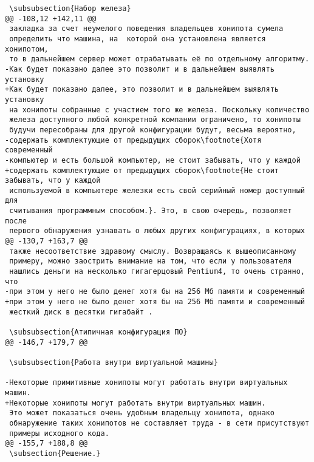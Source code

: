 \begin{verbatim}
 \subsubsection{Набор железа}
@@ -108,12 +142,11 @@
 закладка за счет неумелого поведения владельцев хонипота сумела
 определить что машина, на  которой она установлена является хонипотом,
 то в дальнейшем сервер может отрабатывать её по отдельному алгоритму.
-Как будет показано далее это позволит и в дальнейшем выявлять установку
+Как будет показано далее, это позволит и в дальнейшем выявлять установку
 на хонипоты собранные с участием того же железа. Поскольку количество
 железа доступного любой конкретной компании ограничено, то хонипоты
 будучи пересобраны для другой конфигурации будут, весьма вероятно,
-содержать комплектующие от предыдущих сборок\footnote{Хотя современный
-компьютер и есть большой компьютер, не стоит забывать, что у каждой
+содержать комплектующие от предыдущих сборок\footnote{Не стоит забывать, что у каждой
 используемой в компьютере железки есть свой серийный номер доступный для
 считывания программным способом.}. Это, в свою очередь, позволяет после
 первого обнаружения узнавать о любых других конфигурациях, в которых
@@ -130,7 +163,7 @@
 также несоответствие здравому смыслу. Возвращаясь к вышеописанному
 примеру, можно заострить внимание на том, что если у пользователя
 нашлись деньги на несколько гигагерцовый Pentium4, то очень странно, что
-при этом у него не было денег хотя бы на 256 Мб памяти и современный
+при этом у него не было денег хотя бы на 256 Мб памяти и современный
 жесткий диск в десятки гигабайт .

 \subsubsection{Атипичная конфигурация ПО}
@@ -146,7 +179,7 @@

 \subsubsection{Работа внутри виртуальной машины}

-Некоторые примитивные хонипоты могут работать внутри виртуальных машин.
+Некоторые хонипоты могут работать внутри виртуальных машин.
 Это может показаться очень удобным владельцу хонипота, однако
 обнаружение таких хонипотов не составляет труда - в сети присутствуют
 примеры исходного кода.
@@ -155,7 +188,8 @@
 \subsection{Решение.}


\end{verbatim}
